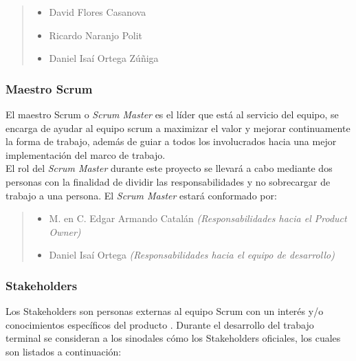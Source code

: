         
    \begin{quote}
    \begin{itemize}
        \item David Flores Casanova
        \item Ricardo Naranjo Polit
        \item Daniel Isaí Ortega Zúñiga
    \end{itemize}
    \end{quote}

\subsubsection{Maestro Scrum}

 El maestro Scrum o {\it Scrum Master} es el líder que está al servicio del equipo,
 se encarga de ayudar al equipo scrum a maximizar el valor y mejorar continuamente la
 forma de trabajo, además de guiar a todos los involucrados hacia una mejor implementación
 del marco de trabajo.\\

 \noindent El rol del {\it Scrum Master} durante este proyecto se llevará a cabo mediante
 dos personas con la finalidad de dividir las responsabilidades y no sobrecargar de trabajo
 a una persona. El {\it Scrum Master} estará conformado por:

    \begin{quote}
    \begin{itemize}
        \item M. en C. Edgar Armando Catalán {\it (Responsabilidades hacia el Product Owner)}
        \item Daniel Isaí Ortega {\it(Responsabilidades hacia el equipo de desarrollo)}
    \end{itemize}                        
    \end{quote}

\subsubsection{Stakeholders}

 Los Stakeholders son personas externas al equipo Scrum con un interés y/o conocimientos
 específicos del producto \cite{ScrumGlosary}. Durante el desarrollo del trabajo terminal
 se consideran a los sinodales cómo los Stakeholders oficiales, los cuales son listados a
 continuación:

